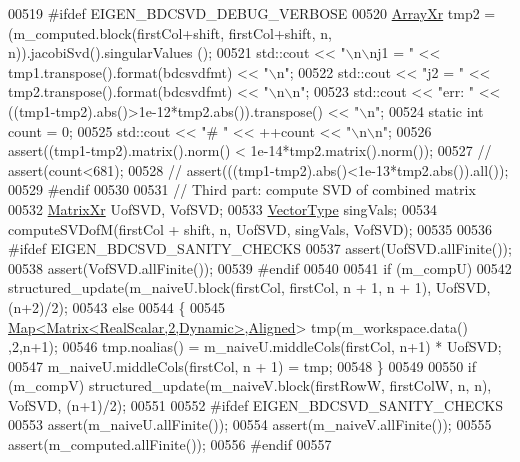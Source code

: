 \begin{DoxyCode}
00519 \textcolor{preprocessor}{#ifdef EIGEN\_BDCSVD\_DEBUG\_VERBOSE}
00520   \hyperlink{group___core___module}{ArrayXr} tmp2 = (m\_computed.block(firstCol+shift, firstCol+shift, n, n)).jacobiSvd().singularValues
      ();
00521   std::cout << \textcolor{stringliteral}{"\(\backslash\)n\(\backslash\)nj1 = "} << tmp1.transpose().format(bdcsvdfmt) << \textcolor{stringliteral}{"\(\backslash\)n"};
00522   std::cout << \textcolor{stringliteral}{"j2 = "} << tmp2.transpose().format(bdcsvdfmt) << \textcolor{stringliteral}{"\(\backslash\)n\(\backslash\)n"};
00523   std::cout << \textcolor{stringliteral}{"err:      "} << ((tmp1-tmp2).abs()>1e-12*tmp2.abs()).transpose() << \textcolor{stringliteral}{"\(\backslash\)n"};
00524   \textcolor{keyword}{static} \textcolor{keywordtype}{int} count = 0;
00525   std::cout << \textcolor{stringliteral}{"# "} << ++count << \textcolor{stringliteral}{"\(\backslash\)n\(\backslash\)n"};
00526   assert((tmp1-tmp2).matrix().norm() < 1e-14*tmp2.matrix().norm());
00527 \textcolor{comment}{//   assert(count<681);}
00528 \textcolor{comment}{//   assert(((tmp1-tmp2).abs()<1e-13*tmp2.abs()).all());}
00529 \textcolor{preprocessor}{#endif}
00530   
00531   \textcolor{comment}{// Third part: compute SVD of combined matrix}
00532   \hyperlink{group___core___module}{MatrixXr} UofSVD, VofSVD;
00533   \hyperlink{group___core___module}{VectorType} singVals;
00534   computeSVDofM(firstCol + shift, n, UofSVD, singVals, VofSVD);
00535   
00536 \textcolor{preprocessor}{#ifdef EIGEN\_BDCSVD\_SANITY\_CHECKS}
00537   assert(UofSVD.allFinite());
00538   assert(VofSVD.allFinite());
00539 \textcolor{preprocessor}{#endif}
00540   
00541   \textcolor{keywordflow}{if} (m\_compU)
00542     structured\_update(m\_naiveU.block(firstCol, firstCol, n + 1, n + 1), UofSVD, (n+2)/2);
00543   \textcolor{keywordflow}{else}
00544   \{
00545     \hyperlink{group___core___module_class_eigen_1_1_map}{Map<Matrix<RealScalar,2,Dynamic>},\hyperlink{group__enums_gga45fe06e29902b7a2773de05ba27b47a1ad37d4c71425bb286e9b4103830538fbf}{Aligned}> tmp(m\_workspace.data()
      ,2,n+1);
00546     tmp.noalias() = m\_naiveU.middleCols(firstCol, n+1) * UofSVD;
00547     m\_naiveU.middleCols(firstCol, n + 1) = tmp;
00548   \}
00549   
00550   \textcolor{keywordflow}{if} (m\_compV)  structured\_update(m\_naiveV.block(firstRowW, firstColW, n, n), VofSVD, (n+1)/2);
00551   
00552 \textcolor{preprocessor}{#ifdef EIGEN\_BDCSVD\_SANITY\_CHECKS}
00553   assert(m\_naiveU.allFinite());
00554   assert(m\_naiveV.allFinite());
00555   assert(m\_computed.allFinite());
00556 \textcolor{preprocessor}{#endif}
00557   

\end{DoxyCode}
